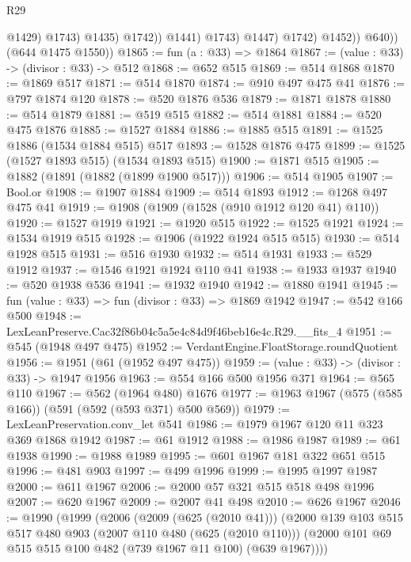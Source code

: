 \begin{lexlean}{R29}
\begin{coremodule}
                                @1429)
                              @1743)
                            @1435)
                          @1742))
                      @1441)
                    @1743)
                  @1447)
                @1742)
              @1452))
          @640))
      (@644 @1475 @1550))
@1865 := fun (a : @33) => @1864
@1867 := (value : @33) -> (divisor : @33) -> @512
@1868 := @652 @515
@1869 := @514 @1868
@1870 := @1869 @517
@1871 := @514 @1870
@1874 := @910 @497 @475 @41
@1876 := @797 @1874 @120
@1878 := @520 @1876 @536
@1879 := @1871 @1878
@1880 := @514 @1879
@1881 := @519 @515
@1882 := @514 @1881
@1884 := @520 @475 @1876
@1885 := @1527 @1884
@1886 := @1885 @515
@1891 := @1525 @1886 (@1534 @1884 @515) @517
@1893 := @1528 @1876 @475
@1899 := @1525 (@1527 @1893 @515) (@1534 @1893 @515)
@1900 := @1871 @515
@1905 := @1882 (@1891 (@1882 (@1899 @1900 @517)))
@1906 := @514 @1905
@1907 := Bool.or
@1908 := @1907 @1884
@1909 := @514 @1893
@1912 := @1268 @497 @475 @41
@1919 := @1908 (@1909 (@1528 (@910 @1912 @120 @41) @110))
@1920 := @1527 @1919
@1921 := @1920 @515
@1922 := @1525 @1921
@1924 := @1534 @1919 @515
@1928 := @1906 (@1922 @1924 @515 @515)
@1930 := @514 @1928 @515
@1931 := @516 @1930
@1932 := @514 @1931
@1933 := @529 @1912
@1937 := @1546 @1921 @1924 @110 @41
@1938 := @1933 @1937
@1940 := @520 @1938 @536
@1941 := @1932 @1940
@1942 := @1880 @1941
@1945 := fun (value : @33) => fun (divisor : @33) => @1869 @1942
@1947 := @542 @166 @500
@1948 := LexLeanPreserve.Cac32f86b04c5a5e4c84d9f46beb16e4c.R29.__fits_4
@1951 := @545 (@1948 @497 @475)
@1952 := VerdantEngine.FloatStorage.roundQuotient
@1956 := @1951 (@61 (@1952 @497 @475))
@1959 := (value : @33) -> (divisor : @33) -> @1947 @1956
@1963 := @554 @166 @500 @1956 @371
@1964 := @565 @110
@1967 := @562 (@1964 @480) @1676
@1977 := @1963 @1967 (@575 (@585 @166)) (@591 (@592 (@593 @371) @500 @569))
@1979 := LexLeanPreservation.conv_let @541
@1986 := @1979 @1967 @120 @11 @323 @369 @1868 @1942
@1987 := @61 @1912
@1988 := @1986 @1987
@1989 := @61 @1938
@1990 := @1988 @1989
@1995 := @601 @1967 @181 @322 @651 @515
@1996 := @481 @903
@1997 := @499 @1996
@1999 := @1995 @1997 @1987
@2000 := @611 @1967
@2006 := @2000 @57 @321 @515 @518 @498 @1996
@2007 := @620 @1967
@2009 := @2007 @41 @498
@2010 := @626 @1967
@2046 := @1990
    (@1999
      (@2006
        (@2009 (@625 (@2010 @41)))
        (@2000
          @139
          @103
          @515
          @517
          @480
          @903
          (@2007 @110 @480 (@625 (@2010 @110)))
          (@2000 @101 @69 @515 @515 @100 @482 (@739 @1967 @11 @100) (@639 @1967))))

\end{coremodule}
\end{lexlean}
